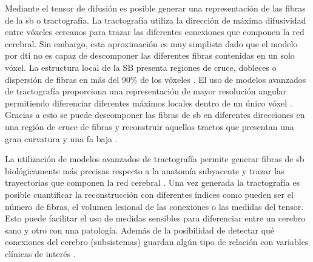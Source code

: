 Mediante el tensor de difusión es posible generar una representación de las fibras de la \gls{sb} o tractografía. La tractografía utiliza la dirección de máxima difusividad entre vóxeles cercanos para trazar las diferentes conexiones que componen la red cerebral. Sin embargo, esta aproximación es muy simplista dado que el modelo por \gls{dti} no es capaz de descomponer las diferentes fibras contenidas en un solo vóxel. La estructura local de la SB presenta regiones de cruce, dobleces o dispersión de fibras en más del 90\% de los vóxeles \cite{Jeurissen2013InvestigatingImaging}. El uso de modelos avanzados de tractografía proporciona una representación de mayor resolución angular permitiendo diferenciar  diferentes máximos locales dentro de un único vóxel \cite{Tuch2002HighHeterogeneity}. Gracias a esto se puede descomponer las fibras de \gls{sb} en diferentes direcciones en una región de cruce de fibras y reconstruir aquellos tractos que presentan una gran curvatura y una \gls{fa} baja \cite{Martinez-Heras2015ImprovedRadiation}.  

La utilización de modelos avanzados de tractografía permite generar fibras de \gls{sb} biológicamente más precisas respecto a la anatomía subyacente y trazar las trayectorias que componen la red cerebral \cite{Rubinov2010ComplexInterpretations}. Una vez generada la  tractografía es posible cuantificar la reconstrucción con diferentes índices como pueden ser el número de fibras, el volumen lesional de las conexiones o las medidas del tensor. Esto puede facilitar el uso de medidas sensibles para diferenciar entre un cerebro sano y otro con una patología. Además de la posibilidad de detectar qué conexiones del cerebro (subsistemas) guardan algún tipo de relación con variables clínicas de interés \cite{Llufriu2017StructuralSclerosis}. 

